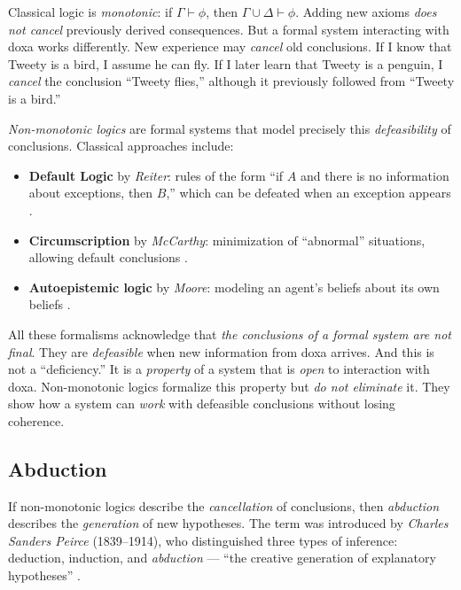 \documentclass[12pt,a4paper]{article}
\begin{document}
Classical logic is \emph{monotonic}: if $\Gamma \vdash \phi$, then
$\Gamma \cup \Delta \vdash \phi$. Adding new axioms \emph{does not cancel}
previously derived consequences. But a formal system interacting with doxa
works differently. New experience may \emph{cancel} old conclusions. If I know
that Tweety is a bird, I assume he can fly. If I later learn that Tweety is a
penguin, I \emph{cancel} the conclusion ``Tweety flies,'' although it
previously followed from ``Tweety is a bird.''

\emph{Non-monotonic logics} are formal systems that model precisely this
\emph{defeasibility} of conclusions. Classical approaches include:

\begin{itemize}
	\item \textbf{Default Logic} by \emph{Reiter}: rules of the form ``if $A$
	      and there is no information about exceptions, then $B$,'' which can
	      be defeated when an exception appears \cite{reiter}.
	\item \textbf{Circumscription} by \emph{McCarthy}: minimization of
	      ``abnormal'' situations, allowing default conclusions
	      \cite{mccarthy}.
	\item \textbf{Autoepistemic logic} by \emph{Moore}: modeling an agent's
	      beliefs about its own beliefs \cite{moore}.
\end{itemize}

All these formalisms acknowledge that \emph{the conclusions of a formal system
are not final}. They are \emph{defeasible} when new information from doxa
arrives. And this is not a ``deficiency.'' It is a \emph{property} of a system
that is \emph{open} to interaction with doxa. Non-monotonic logics formalize
this property but \emph{do not eliminate} it. They show how a system can
\emph{work} with defeasible conclusions without losing coherence.

\subsection{Abduction}
\label{sec:abduction}

If non-monotonic logics describe the \emph{cancellation} of conclusions, then
\emph{abduction} describes the \emph{generation} of new hypotheses. The term
was introduced by \emph{Charles Sanders Peirce} (1839--1914), who distinguished
three types of inference: deduction, induction, and \emph{abduction} ---
``the creative generation of explanatory hypotheses'' \cite{peirce_ru}.
\end{document}
